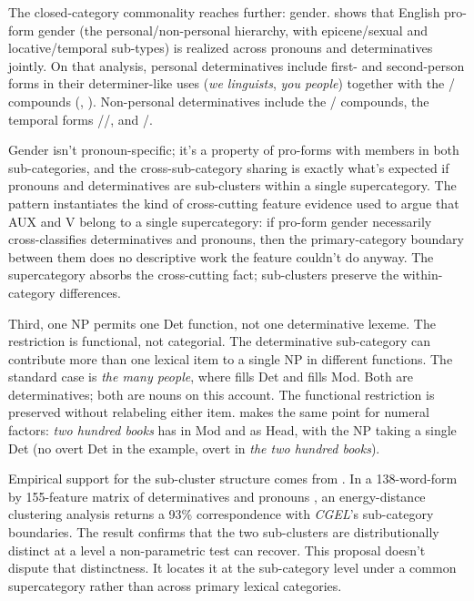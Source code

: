 \documentclass[12pt]{article}
\begin{document}
The closed-category commonality reaches further: gender. \textcite{anon2026gender} shows that English pro-form gender (the personal/non-personal hierarchy, with epicene/sexual and locative/temporal sub-types) is realized across pronouns and determinatives jointly. On that analysis, personal determinatives include first- and second-person forms in their determiner-like uses (\textit{we linguists}, \textit{you people}) together with the / compounds (, ). Non-personal determinatives include the / compounds, the temporal forms //, and /.

Gender isn't pronoun-specific; it's a property of pro-forms with members in both sub-categories, and the cross-sub-category sharing is exactly what's expected if pronouns and determinatives are sub-clusters within a single supercategory. The pattern instantiates the kind of cross-cutting feature evidence \textcite[§1.2]{pullumwilson1977} used to argue that AUX and V belong to a single supercategory: if pro-form gender necessarily cross-classifies determinatives and pronouns, then the primary-category boundary between them does no descriptive work the feature couldn't do anyway. The supercategory absorbs the cross-cutting fact; sub-clusters preserve the within-category differences.

Third, one NP permits one Det function, not one determinative lexeme. The restriction is functional, not categorial. The determinative sub-category can contribute more than one lexical item to a single NP in different functions. The standard case is \textit{the many people}, where  fills Det and  fills Mod. Both are determinatives; both are nouns on this account. The functional restriction is preserved without relabeling either item. \textcite{anon2026numerals} makes the same point for numeral factors: \textit{two hundred books} has  in Mod and  as Head, with the NP taking a single Det (no overt Det in the example, overt in \textit{the two hundred books}).

Empirical support for the sub-cluster structure comes from \textcite{anon2021dist}. In a 138-word-form by 155-feature matrix of determinatives and pronouns \citep{anon2021matrix}, an energy-distance clustering analysis returns a 93\% correspondence with \textit{CGEL}'s sub-category boundaries. The result confirms that the two sub-clusters are distributionally distinct at a level a non-parametric test can recover. This proposal doesn't dispute that distinctness. It locates it at the sub-category level under a common supercategory rather than across primary lexical categories.
\end{document}
